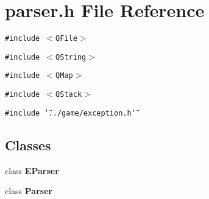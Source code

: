 \section{parser.h File Reference}
\label{parser_8h}
{\tt \#include $<$QFile$>$}\par
{\tt \#include $<$QString$>$}\par
{\tt \#include $<$QMap$>$}\par
{\tt \#include $<$QStack$>$}\par
{\tt \#include \char`\"{}../game/exception.h\char`\"{}}\par
\subsection*{Classes}
\begin{CompactItemize}
\item 
class {\bf EParser}
\item 
class {\bf Parser}
\end{CompactItemize}
